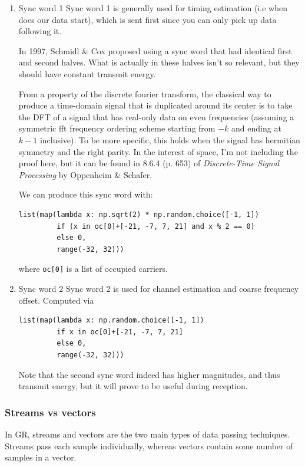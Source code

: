 \documentclass[11pt]{article}
\begin{document}
\begin{enumerate}
\item Sync word 1
\label{sec:orgd89c667}
Sync word 1 is generally used for timing estimation (i.e when does our
data start), which is sent first since you can only pick up data
following it.

In 1997, Schmidl \& Cox proposed using a sync word that had identical
first and second halves. What is actually in these halves isn't so
relevant, but they should have constant transmit energy.

From a property of the discrete fourier transform, the classical way
to produce a time-domain signal that is duplicated around its center
is to take the DFT of a signal that has real-only data on even
frequencies (assuming a symmetric fft frequency ordering scheme
starting from \(-k\) and ending at \(k-1\) inclusive). To be more
specific, this holds when the signal has hermitian symmetry and the
right parity. In the interest of space, I'm not including the proof
here, but it can be found in 8.6.4 (p. 653) of \emph{Discrete-Time Signal
Processing} by Oppenheim \& Schafer.

We can produce this sync word with:
\begin{verbatim}
list(map(lambda x: np.sqrt(2) * np.random.choice([-1, 1])
         if (x in oc[0]+[-21, -7, 7, 21] and x % 2 == 0)
         else 0,
         range(-32, 32)))
\end{verbatim}
where \texttt{oc[0]} is a list of occupied carriers.

\item Sync word 2
\label{sec:org2b1fd95}
Sync word 2 is used for channel estimation and coarse frequency
offset. Computed via

\begin{verbatim}
list(map(lambda x: np.random.choice([-1, 1])
         if x in oc[0]+[-21, -7, 7, 21]
         else 0,
         range(-32, 32)))
\end{verbatim}

Note that the second sync word indeed has higher magnitudes, and thus
transmit energy, but it will prove to be useful during reception.
\end{enumerate}

\subsubsection{Streams vs vectors}
\label{sec:orgf664a89}
In GR, streams and vectors are the two main types of data passing
techniques. Streams pass each sample individually, whereas vectors
contain some number of samples in a vector.
\end{document}
